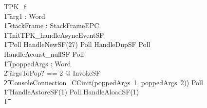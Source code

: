 \begin{figure}[tp!]
  \centering
  \setlength{\zedtab}{0.4cm}
  \setlength{\zedindent}{0pt}
  \setlength{\zedleftsep}{0pt}
  \setlength{\abovedisplayskip}{0pt}
  \setlength{\belowdisplayskip}{0pt}
  \setlength{\abovedisplayshortskip}{0pt}
  \setlength{\belowdisplayshortskip}{0pt}
  \begin{circusaction}
    TPK\_f \circdef \\
    \t1 \circval arg1 : Word \circspot \\
    \t1 \circvar stackFrame : StackFrameEPC \circspot \\
    \t1 \lschexpract InitTPK\_handleAsyncEventSF \rschexpract \circseq \\
    \t1 Poll \circseq HandleNewSF(27) \circseq Poll \circseq HandleDupSF \circseq Poll \circseq  HandleAconst\_nullSF \circseq Poll \circseq \\
    \t1 (\circvar poppedArgs : \seq Word \circspot \\
    \t2 \lschexpract \exists argsToPop? == 2 @ InvokeSF \rschexpract \circseq \\
    \t2 ConsoleConnection\_CCinit(poppedArgs~1, poppedArgs~2)) \circseq Poll \circseq \\
    \t1 HandleAstoreSF(1) \circseq Poll \circseq HandleAloadSF(1) \circseq \\
    \t1 {} \cdots {} \\

\end{circusaction}
\end{figure}
